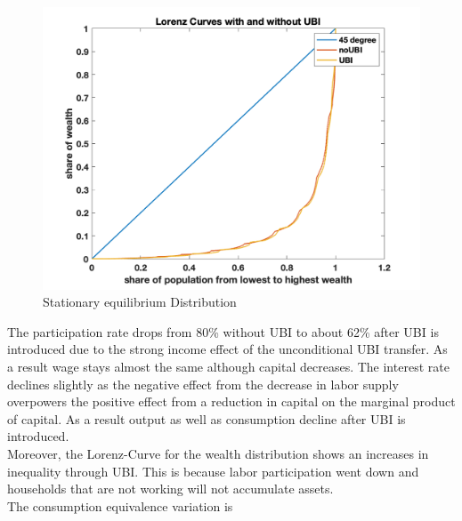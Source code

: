 \documentclass[letterpaper,12pt]{article}
\begin{document}
\begin{figure}
\includegraphics[scale=0.5]{Figures/Part2_UBI/Lorenz_Income}
\caption{Stationary equilibrium Distribution}
\end{figure}

The participation rate drops from 80\% without UBI to about 62\% after UBI is introduced due to the strong income effect of the unconditional UBI transfer. As a result wage stays almost the same although capital decreases. The interest rate declines slightly as the negative effect from the decrease in labor supply overpowers the positive effect from a reduction in capital on the marginal product of capital. As a result output as well as consumption decline after UBI is introduced. \\
Moreover, the Lorenz-Curve for the wealth distribution shows an increases in inequality through UBI. This is because labor participation went down and households that are not working will not accumulate assets. \\

The consumption equivalence variation is 
\end{document}
